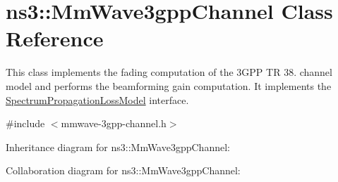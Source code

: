 \hypertarget{classns3_1_1MmWave3gppChannel}{}\section{ns3\+:\+:Mm\+Wave3gpp\+Channel Class Reference}
\label{classns3_1_1MmWave3gppChannel}


This class implements the fading computation of the 3\+G\+PP TR 38. channel model and performs the beamforming gain computation. It implements the \hyperlink{classns3_1_1SpectrumPropagationLossModel}{Spectrum\+Propagation\+Loss\+Model} interface.  




{\ttfamily \#include $<$mmwave-\/3gpp-\/channel.\+h$>$}



Inheritance diagram for ns3\+:\+:Mm\+Wave3gpp\+Channel\+:


Collaboration diagram for ns3\+:\+:Mm\+Wave3gpp\+Channel\+:

